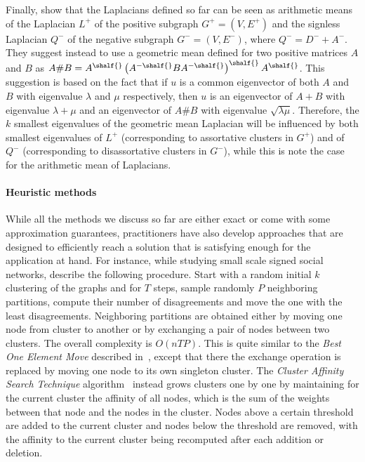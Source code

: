 Finally, \textcite{mGeometricMean16} show that the Laplacians defined so far can be seen as
arithmetic means of the Laplacian $L^+$ of the positive subgraph $G^+=(V, E^+)$ and the signless
Laplacian $Q^-$ of the negative subgraph $G^-=(V, E^-)$, where $Q^- = D^- + A^-$. They suggest
instead to use a geometric mean defined for two positive matrices $A$ and $B$ as $A\#B =
A^{\shalf{}} \left(A^{-\shalf{}} BA^{-\shalf{}} \right)^{\shalf{}} A^{\shalf{}}$. This suggestion is
based on the fact that if $u$ is a common eigenvector of both $A$ and $B$ with eigenvalue $\lambda$
and $\mu$ respectively, then $u$ is an eigenvector of $A+B$ with eigenvalue $\lambda+\mu$ and an
eigenvector of $A\#B$ with eigenvalue $\sqrt{\lambda\mu}$. Therefore, the $k$ smallest eigenvalues
of the geometric mean Laplacian will be influenced by both smallest eigenvalues of $L^+$
(corresponding to assortative clusters in $G^+$) and of $Q^-$ (corresponding to disassortative
clusters in $G^-$), while this is note the case for the arithmetic mean of Laplacians.

\paragraph{Heuristic methods}

While all the methods we discuss so far
are either exact or come with some approximation guarantees, practitioners have also develop
approaches that are designed to efficiently reach a solution that is satisfying enough for the
application at hand. For instance, while studying small scale signed social networks,
\textcite{Early96} describe the following procedure. Start with a random initial $k$ clustering of
the graphs and for $T$ steps, sample randomly $P$ neighboring partitions, compute their number of
disagreements and move the one with the least disagreements. Neighboring partitions are obtained
either by moving one node from cluster to another or by exchanging a pair of nodes between two
clusters. The overall complexity is $O(nTP)$. This is quite similar to the \emph{Best One Element
Move} described in~\autocite{Gionis2007}, except that there the exchange operation is replaced by moving
one node to its own singleton cluster. The \emph{Cluster Affinity Search Technique}
algorithm~\autocite{Ben-Dor99} instead grows clusters one by one by maintaining for the current
cluster the affinity of all nodes, which is the sum of the weights between that node and the nodes in
the cluster. Nodes above a certain threshold are added to the current cluster and nodes below the
threshold are removed, with the affinity to the current cluster being recomputed after each addition
or deletion.

